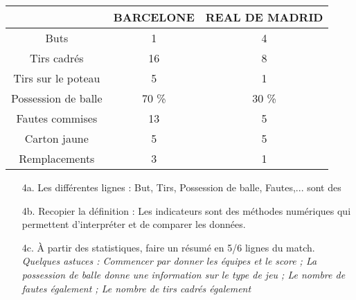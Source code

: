 \begin{center}
  \begin{tabular}{|c|c|c|} \hline
                        & BARCELONE & REAL DE MADRID \\  \hline
    Buts                &         1 &              4 \\  \hline
    Tirs cadrés         &        16 & 8 \\  \hline
    Tirs sur le poteau  &         5 & 1  \\  \hline
    Possession de balle &     70 \% & 30 \%  \\ \hline
    Fautes commises     &        13 & 5 \\  \hline
    Carton jaune        &         5 & 5 \\  \hline
    Remplacements       &         3 & 1 \\  \hline
  \end{tabular}
\end{center}

\begin{enumerate}
  \item[4a.] Les  différentes lignes : But, Tirs, Possession de balle, Fautes,... sont des \dotfill
  \item[4b.] Recopier la définition : \og Les indicateurs sont des méthodes numériques qui permettent d’interpréter et de comparer les données. \fg \dotfill \\ \Pointilles[1]
  \item[4c.] À partir des statistiques, faire un résumé en 5/6 lignes du match.
  \textit{Quelques astuces : Commencer par donner les équipes et le score ; La possession de balle donne une information sur le type de jeu ; Le nombre de fautes également ; Le nombre de tirs cadrés également}

  \Pointilles[10]
\end{enumerate} 

